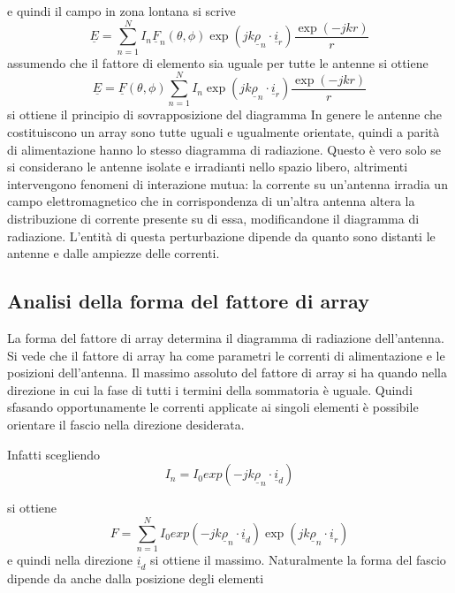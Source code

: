 \documentclass[10pt,a4paper]{book}
\begin{document}
e quindi il campo in zona lontana si scrive 
\begin{equation}
\underline{E} = \sum_{n = 1}^N I_n \underline{F}_n(\theta,\phi) \exp\left(j k \underline{\rho}_n \cdot \underline{i}_r \right)\frac{\exp\left(-j k r\right)}{r}
\end{equation}
assumendo che il fattore di elemento sia uguale per tutte le antenne si ottiene 
\begin{equation}
\underline{E} = \underline{F}(\theta,\phi) \sum_{n = 1}^N I_n  \exp\left(j k \underline{\rho}_n \cdot \underline{i}_r \right)\frac{\exp\left(-j k r\right)}{r}
\end{equation}
si ottiene il principio di sovrapposizione del diagramma
In genere le antenne che costituiscono un array sono tutte uguali e ugualmente orientate, quindi a parità di alimentazione hanno lo stesso diagramma di radiazione. Questo è vero solo se si considerano le antenne isolate e irradianti nello spazio libero, altrimenti intervengono fenomeni di interazione mutua: la corrente su un'antenna irradia un campo elettromagnetico che in corrispondenza di un'altra antenna altera la distribuzione di corrente presente su di essa, modificandone il diagramma di radiazione. L'entità di questa perturbazione dipende da quanto sono distanti le antenne e dalle ampiezze delle correnti. 
\subsection{Analisi della forma del fattore di array}
La forma del fattore di array determina il diagramma di radiazione dell'antenna. Si vede che il fattore di array ha come parametri le correnti di alimentazione e le posizioni dell'antenna. Il massimo assoluto del fattore di array si ha quando nella direzione in cui la fase di tutti i termini della sommatoria è uguale. Quindi sfasando opportunamente le correnti applicate ai singoli elementi è possibile orientare il fascio nella direzione desiderata.

Infatti scegliendo
\begin{equation}
I_n = I_0 exp\left(- j k  \underline{\rho}_n \cdot \underline{i}_d \right)
\end{equation}
 
si ottiene 
\begin{equation}
F = \sum_{n = 1}^N  I_0 exp\left(- j k  \underline{\rho}_n \cdot \underline{i}_d \right)  \exp\left(j k \underline{\rho}_n \cdot \underline{i}_r \right)
\end{equation}
e quindi nella direzione $\underline{i}_d$  si ottiene il massimo. Naturalmente la forma del fascio dipende da anche dalla posizione degli elementi
\end{document}
